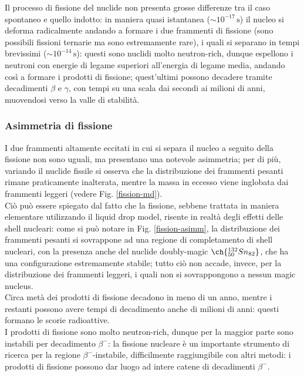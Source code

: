 Il processo di fissione del nuclide non presenta grosse differenze tra il caso spontaneo e quello indotto: in maniera quasi istantanea ($ \sim 10^{-17}\,\text{s} $) il nucleo si deforma radicalmente andando a formare i due frammenti di fissione (sono possibili fissioni ternarie ma sono estremamente rare), i quali si separano in tempi brevissimi ($ \sim 10^{-14}\,\text{s} $): questi sono nuclidi molto neutron-rich, dunque espellono i neutroni con energie di legame superiori all'energia di legame media, andando così a formare i prodotti di fissione; quest'ultimi possono decadere tramite decadimenti $ \beta $ e $ \gamma $, con tempi su una scala dai secondi ai milioni di anni, muovendosi verso la valle di stabilità.

\subsubsection{Asimmetria di fissione}

I due frammenti altamente eccitati in cui si separa il nucleo a seguito della fissione non sono uguali, ma presentano una notevole asimmetria; per di più, variando il nuclide fissile si osserva che la distribuzione dei frammenti pesanti rimane praticamente inalterata, mentre la massa in eccesso viene inglobata dai frammenti leggeri (vedere Fig. \ref{fission-md}).\\
Ciò può essere spiegato dal fatto che la fissione, sebbene trattata in maniera elementare utilizzando il liquid drop model, risente in realtà degli effetti delle shell nucleari: come si può notare in Fig. \ref{fission-asimm}, la distribuzione dei frammenti pesanti si sovrappone ad una regione di completamento di shell nucleari, con la presenza anche del nuclide doubly-magic $ \ch{^{132}_{50} Sn_{82}} $, che ha una configurazione estremamente stabile; tutto ciò non accade, invece, per la distribuzione dei frammenti leggeri, i quali non si sovrappongono a nessun magic nucleus.\\
Circa metà dei prodotti di fissione decadono in meno di un anno, mentre i restanti possono avere tempi di decadimento anche di milioni di anni: questi formano le scorie radioattive.\\
I prodotti di fissione sono molto neutron-rich, dunque per la maggior parte sono instabili per decadimento $ \beta^- $: la fissione nucleare è un importante strumento di ricerca per la regione $ \beta^- $-instabile, difficilmente raggiungibile con altri metodi: i prodotti di fissione possono dar luogo ad intere catene di decadimenti $ \beta^- $.

